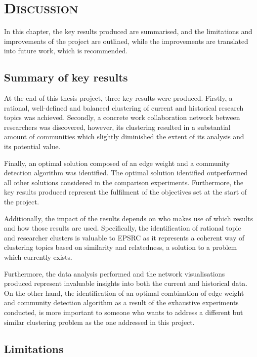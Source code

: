 \chapter{\textsc{Discussion}}
\label{chapter:discussion}

In this chapter, the key results produced are summarised, and the limitations and improvements of the project are outlined, while the improvements are translated into future work, which is recommended.

\section{Summary of key results}

At the end of this thesis project, three key results were produced. Firstly, a rational, well-defined and balanced clustering of current and historical research topics was achieved. Secondly, a concrete work collaboration network between researchers was discovered, however, its clustering resulted in a substantial amount of communities which slightly diminished the extent of its analysis and its potential value.

Finally, an optimal solution composed of an edge weight and a community detection algorithm was identified. The optimal solution identified outperformed all other solutions considered in the comparison experiments. Furthermore, the key results produced represent the fulfilment of the objectives set at the start of the project.

Additionally, the impact of the results depends on who makes use of which results and how those results are used. Specifically, the identification of rational topic and researcher clusters is valuable to EPSRC as it represents a coherent way of clustering topics based on similarity and relatedness, a solution to a problem which currently exists.

Furthermore, the data analysis performed and the network visualisations produced represent invaluable insights into both the current and historical data. On the other hand, the identification of an optimal combination of edge weight and community detection algorithm as a result of the exhaustive experiments conducted, is more important to someone who wants to address a different but similar clustering problem as the one addressed in this project.

\section{Limitations}

